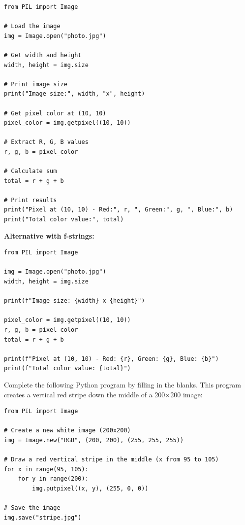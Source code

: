 \documentclass{csexam}
\begin{document}
\begin{questions}
\begin{solution}
\begin{lstlisting}
from PIL import Image

# Load the image
img = Image.open("photo.jpg")

# Get width and height
width, height = img.size

# Print image size
print("Image size:", width, "x", height)

# Get pixel color at (10, 10)
pixel_color = img.getpixel((10, 10))

# Extract R, G, B values
r, g, b = pixel_color

# Calculate sum
total = r + g + b

# Print results
print("Pixel at (10, 10) - Red:", r, ", Green:", g, ", Blue:", b)
print("Total color value:", total)
\end{lstlisting}

\textbf{Alternative with f-strings:}
\begin{lstlisting}
from PIL import Image

img = Image.open("photo.jpg")
width, height = img.size

print(f"Image size: {width} x {height}")

pixel_color = img.getpixel((10, 10))
r, g, b = pixel_color
total = r + g + b

print(f"Pixel at (10, 10) - Red: {r}, Green: {g}, Blue: {b}")
print(f"Total color value: {total}")
\end{lstlisting}
\end{solution}

\newpage

\question[12] Complete the following Python program by filling in the blanks. This program creates a vertical red stripe down the middle of a 200×200 image:

\begin{solution}
\begin{lstlisting}
from PIL import Image

# Create a new white image (200x200)
img = Image.new("RGB", (200, 200), (255, 255, 255))

# Draw a red vertical stripe in the middle (x from 95 to 105)
for x in range(95, 105):
    for y in range(200):
        img.putpixel((x, y), (255, 0, 0))

# Save the image
img.save("stripe.jpg")
\end{lstlisting}


\end{solution}
\end{questions}
\end{document}
